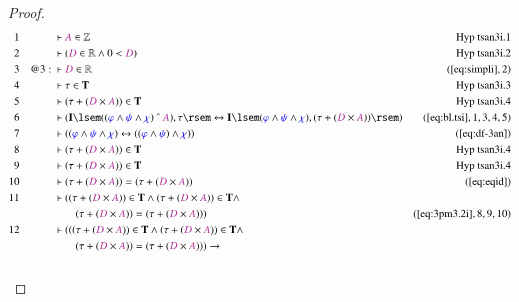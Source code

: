 \begin{proof}
\begin{align}
  1 &&  & \vdash \mc{A} \in \mathbb{Z}&\text{Hyp~tsan3i.1}\notag%
  \\ 2 &&  & \vdash ( \mc{D} \in \mathbb{R} \wedge 0 < \mc{D}
      )&\text{Hyp~tsan3i.2}\notag%
  \\ 3 && @3:\  & \vdash \mc{D} \in \mathbb{R}&(\mbox{\ref{eq:simpli}},2)\notag
  \\ 4 &&  & \vdash \tau \in \mathbf{T}&\text{Hyp~tsan3i.3}\notag%
  \\ 5 &&  & \vdash ( \tau + ( \mc{D} \times \mc{A} ) ) \in
      \mathbf{T}&\text{Hyp~tsan3i.4}\notag%
  \\ 6 &&  & \vdash ( \mathbf{I} \lsem ( ( \mw{\varphi} \wedge \mw{\psi} \wedge
      \mw{\chi} ) ~\string^~ \mc{A} ) , \tau \rsem
      \leftrightarrow \mathbf{I} \lsem ( \mw{\varphi}
      \wedge \mw{\psi} \wedge \mw{\chi} ) , ( \tau + (
      \mc{D} \times \mc{A} ) ) \rsem
      )&(\mbox{\ref{eq:bl.tsi}},1,3,4,5)\notag
  \\ 7 &&  & \vdash ( ( \mw{\varphi} \wedge \mw{\psi} \wedge \mw{\chi} )
      \leftrightarrow ( ( \mw{\varphi} \wedge \mw{\psi} )
      \wedge \mw{\chi} ) )&(\mbox{\ref{eq:df-3an}})\notag
  \\ 8 &&  & \vdash ( \tau + ( \mc{D} \times \mc{A} ) ) \in
      \mathbf{T}&\text{Hyp~tsan3i.4}\notag%
  \\ 9 &&  & \vdash ( \tau + ( \mc{D} \times \mc{A} ) ) \in
      \mathbf{T}&\text{Hyp~tsan3i.4}\notag%
  \\ 10 &&  & \vdash ( \tau + ( \mc{D} \times \mc{A} ) ) = ( \tau + ( \mc{D}
      \times \mc{A} ) )&(\mbox{\ref{eq:eqid}})\notag
  \\ 11 &&  & \vdash ( ( \tau + ( \mc{D} \times \mc{A} ) ) \in \mathbf{T} \wedge
      ( \tau + ( \mc{D} \times \mc{A} ) ) \in \mathbf{T}
      \wedge  \notag \\ & & & \qquad
     ( \tau + ( \mc{D} \times \mc{A} ) ) = ( \tau +
      ( \mc{D} \times \mc{A} ) )
      )&(\mbox{\ref{eq:3pm3.2i}},8,9,10)\notag
  \\ 12 &&  & \vdash ( ( ( \tau + ( \mc{D} \times \mc{A} ) ) \in \mathbf{T}
      \wedge ( \tau + ( \mc{D} \times \mc{A} ) ) \in
      \mathbf{T} \wedge  \notag \\ & & & \qquad
     ( \tau + ( \mc{D} \times \mc{A} ) )
      = ( \tau + ( \mc{D} \times \mc{A} ) ) ) \rightarrow  \notag \\ & & & \qquad

\end{align}
\end{proof}
